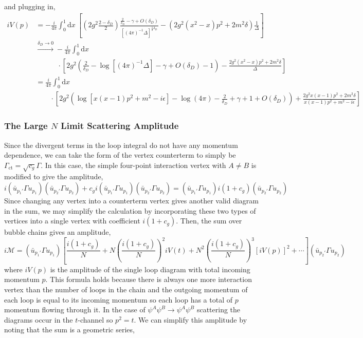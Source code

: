 \documentclass[12pt]{article}
\renewcommand{\d}[1]{ \mathrm{d}#1 \:}
\begin{document}
and plugging in,
\begin{align*}
i V(p) 
& = -\frac{i}{4 \pi} \int_0^1 \d{x} \left[ \left(2 g^2  \frac{2 - \delta_D}{2} \right) \frac{\frac{2}{\delta_D} - \gamma + O(\delta_D) }{[(4\pi)^{-1} \Delta]^{\frac{1}{2} \delta_D}} - \left( 2 g^2 (x^2 - x) p^2 + 2 m^2 \delta \right) \frac{1}{\Delta} \right]
\\
& \xrightarrow{\delta_D \to 0}  -\frac{i}{4 \pi} \int_0^1 \d{x}
\\
& \quad \quad \quad \cdot \left[ 2 g^2 \left( \frac{2}{\delta_D} - \log{\left[(4 \pi)^{-1} \Delta \right]} - \gamma + O(\delta_D) - 1 \right) - \frac{ 2 g^2 (x^2 - x) p^2 + 2 m^2 \delta }{\Delta} \right]
\\
& = \frac{i}{4 \pi} \int_0^1 \d{x}
\\
& \quad \quad \cdot \left[ 2 g^2 \left(\log{[ x(x-1) p^2 + m^2 - i \epsilon]} - \log{(4 \pi)} - \frac{2}{\delta_D} + \gamma + 1 + O(\delta_D) \right) + \frac{ 2 g^2 x(x - 1) p^2 + 2 m^2 \delta }{x(x-1) p^2 + m^2 - i \epsilon} \right]
\end{align*} 

\subsubsection{The Large $N$ Limit Scattering Amplitude}

Since the divergent terms in the loop integral do not have any momentum dependence, we can take the form of the vertex counterterm to simply be $\Gamma_{\mathrm{ct}} = \sqrt{c_g} \Gamma$. In this case, the simple four-point interaction vertex with $A \neq B$ is modified to give the amplitude,
\[ i ( \bar{u}_{p_1'} \Gamma u_{p_1}) (\bar{u}_{p_2'} \Gamma u_{p_2}) + c_g i ( \bar{u}_{p_1'} \Gamma u_{p_1}) (\bar{u}_{p_2'} \Gamma u_{p_2}) = ( \bar{u}_{p_1'} \Gamma u_{p_1}) i(1 + c_g) (\bar{u}_{p_2'} \Gamma u_{p_2}) \]
Since changing any vertex into a counterterm vertex gives another valid diagram in the sum, we may simplify the calculation by incorporating these two types of vertices into a single vertex with coefficient $i(1 + c_g)$. Then, the sum over bubble chains gives an amplitude,
\[ i \mathcal{M} = ( \bar{u}_{p_1'} \Gamma u_{p_1}) \left[ \frac{i(1 + c_g)}{N} + N \left( \frac{i(1 + c_g)}{N} \right)^2 i V(t) + N^2 \left( \frac{i(1 + c_g)}{N} \right)^3 [i V(p)]^2 + \cdots  \right] (\bar{u}_{p_2'} \Gamma u_{p_2}) \]
where $i V(p)$ is the amplitude of the single loop diagram with total incoming momentum $p$. This formula holds because there is always one more interaction vertex than the number of loops in the chain and the outgoing momentum of each loop is equal to its incoming momentum so each loop has a total of $p$ momentum flowing through it. In the case of $\psi^A \psi^B \to \psi^A \psi^B$ scattering the diagrams occur in the $t$-channel so $p^2 =  t$. We can simplify this amplitude by noting that the sum is a geometric series,
\end{document}
